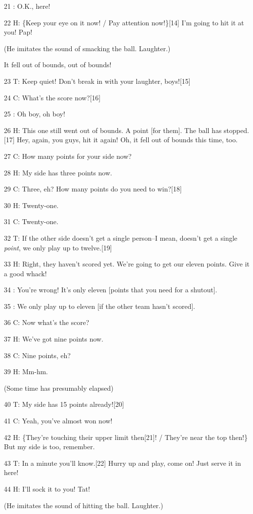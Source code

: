 21    : O.K., here!

22 H: \{Keep your eye on it now! / Pay attention now!\}[14] I'm going to hit it
at you! Pap!

(He imitates the sound of smacking the ball. Laughter.)

It fell out of bounds, out of bounds!

23 T: Keep quiet! Don't break in with your laughter, boys![15]

24 C: What's the score now?[16]

25    : Oh boy, oh boy!

26 H: This one still went out of bounds. A point [for them]. The ball has stopped.[17]
Hey, again, you guys, hit it again! Oh, it fell out of bounds this time, too.

27 C: How many points for your side now?

28 H: My side has three points now.

29 C: Three, eh? How many points do you need to win?[18]

30 H: Twenty-one.

31 C: Twenty-one.

32 T: If the other side doesn't get a single person--I mean, doesn't get a single
\textit{point}, we only play up to twelve.[19]

33 H: Right, they haven't scored yet. We're going to get our eleven points. Give
it a good whack!

34    : You're wrong! It's only eleven [points that you need for a shutout].

35    : We only play up to eleven [if the other team hasn't scored].

36 C: Now what's the score?

37 H: We've got nine points now.

38 C: Nine points, eh?

39 H: Mm-hm.

(Some time has presumably elapsed)

40 T: My side has 15 points already![20]

41 C: Yeah, you've almost won now!

42 H: \{They're touching their upper limit then[21]! / They're near the top then!\}
But my side is too, remember.

43 T: In a minute you'll know.[22] Hurry up and play, come on! Just serve it in
here!

44 H: I'll sock it to you! Tat!

(He imitates the sound of hitting the ball. Laughter.)

